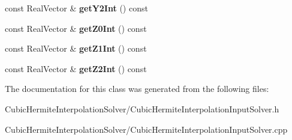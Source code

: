 \begin{DoxyCompactItemize}
\item 
\hypertarget{classCubicHermiteInterpolationInputSolver_ae967f5ec314040184a130353f155246e}{
const RealVector \& {\bfseries getY2Int} () const }
\label{classCubicHermiteInterpolationInputSolver_ae967f5ec314040184a130353f155246e}

\item 
\hypertarget{classCubicHermiteInterpolationInputSolver_a5621da0e021e3c4f1a9bb0191b8644fd}{
const RealVector \& {\bfseries getZ0Int} () const }
\label{classCubicHermiteInterpolationInputSolver_a5621da0e021e3c4f1a9bb0191b8644fd}

\item 
\hypertarget{classCubicHermiteInterpolationInputSolver_ad1671ab8460455a1e35a42e79b2feaf3}{
const RealVector \& {\bfseries getZ1Int} () const }
\label{classCubicHermiteInterpolationInputSolver_ad1671ab8460455a1e35a42e79b2feaf3}

\item 
\hypertarget{classCubicHermiteInterpolationInputSolver_af04cbd96ed2cd9a38c9cc00194aa150f}{
const RealVector \& {\bfseries getZ2Int} () const }
\label{classCubicHermiteInterpolationInputSolver_af04cbd96ed2cd9a38c9cc00194aa150f}

\end{DoxyCompactItemize}


The documentation for this class was generated from the following files:\begin{DoxyCompactItemize}
\item 
CubicHermiteInterpolationSolver/CubicHermiteInterpolationInputSolver.h\item 
CubicHermiteInterpolationSolver/CubicHermiteInterpolationInputSolver.cpp\end{DoxyCompactItemize}
